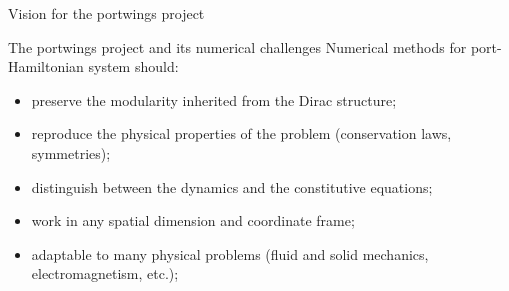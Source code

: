 \documentclass[aspectratio=169]{beamer}
\begin{document}
\begin{frame}{Vision for the portwings project}
	
\end{frame}

\begin{frame}{The portwings project and its numerical challenges}
	Numerical methods for port-Hamiltonian system should:
	\begin{itemize}[<+->]
		\item preserve the modularity inherited from the Dirac structure;
		\item reproduce the physical properties of the problem (conservation laws, symmetries);
		\item distinguish between the dynamics and the constitutive equations;
		\item work in any spatial dimension and coordinate frame;
		\item adaptable to many physical problems (fluid and solid mechanics, electromagnetism, etc.);
	\end{itemize}
\end{frame}
\end{document}
